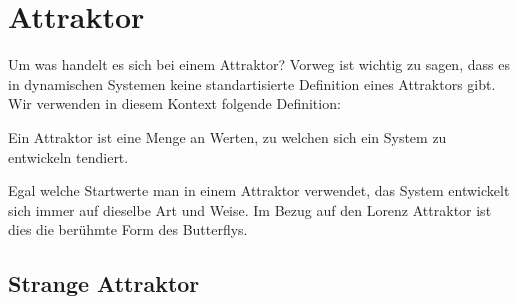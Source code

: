 \documentclass[attraktor.tex]{subfiles}
\begin{document}
	\section{Attraktor}
	Um was handelt es sich bei einem Attraktor?
	Vorweg ist wichtig zu sagen, dass es in dynamischen Systemen keine standartisierte Definition eines Attraktors gibt. Wir verwenden in diesem Kontext folgende Definition: 
	\begin{center}
		Ein Attraktor ist eine Menge an Werten, zu welchen sich ein System zu entwickeln tendiert.
	\end{center} Egal welche Startwerte man in einem Attraktor verwendet, das System entwickelt sich immer auf dieselbe Art und Weise. Im Bezug auf den Lorenz Attraktor ist dies die berühmte Form des Butterflys. 
	
	\subsection{Strange Attraktor}
\end{document}
